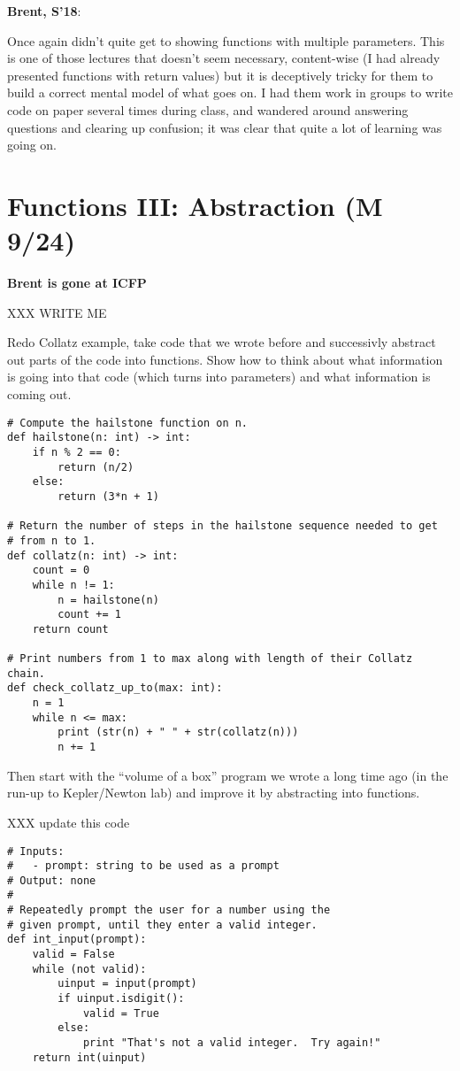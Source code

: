 \documentclass{article}
\newenvironment{reflect}[1]
{
  \noindent
  \begin{lrbox}{\reflectbox}
    \begin{minipage}[t]{\textwidth}
      \textbf{#1}:
}{
    \end{minipage}
  \end{lrbox}
  \fbox{\usebox{\reflectbox}}
}
\begin{document}
\begin{reflect}{Brent, S'18}
  Once again didn't quite get to showing functions with multiple
  parameters.  This is one of those lectures that doesn't seem
  necessary, content-wise (I had already presented functions with
  return values) but it is deceptively tricky for them to build a
  correct mental model of what goes on.  I had them work in groups to
  write code on paper several times during class, and wandered around
  answering questions and clearing up confusion; it was clear that
  quite a lot of learning was going on.
\end{reflect}

\newpage
\section{Functions III: Abstraction (M 9/24)}

\textbf{Brent is gone at ICFP}

XXX WRITE ME

Redo Collatz example, take code that we wrote before and successivly
abstract out parts of the code into functions.  Show how to think
about what information is going into that code (which turns into
parameters) and what information is coming out.

\begin{verbatim}
# Compute the hailstone function on n.
def hailstone(n: int) -> int:
    if n % 2 == 0:
        return (n/2)
    else:
        return (3*n + 1)

# Return the number of steps in the hailstone sequence needed to get
# from n to 1.
def collatz(n: int) -> int:
    count = 0
    while n != 1:
        n = hailstone(n)
        count += 1
    return count

# Print numbers from 1 to max along with length of their Collatz chain.
def check_collatz_up_to(max: int):
    n = 1
    while n <= max:
        print (str(n) + " " + str(collatz(n)))
        n += 1
\end{verbatim}

Then start with the ``volume of a box'' program we wrote a long time
ago (in the run-up to Kepler/Newton lab) and improve it by abstracting
into functions.

XXX update this code
\begin{verbatim}
# Inputs:
#   - prompt: string to be used as a prompt
# Output: none
#
# Repeatedly prompt the user for a number using the
# given prompt, until they enter a valid integer.
def int_input(prompt):
    valid = False
    while (not valid):
        uinput = input(prompt)
        if uinput.isdigit():
            valid = True
        else:
            print "That's not a valid integer.  Try again!"
    return int(uinput)
\end{verbatim}
\end{document}

